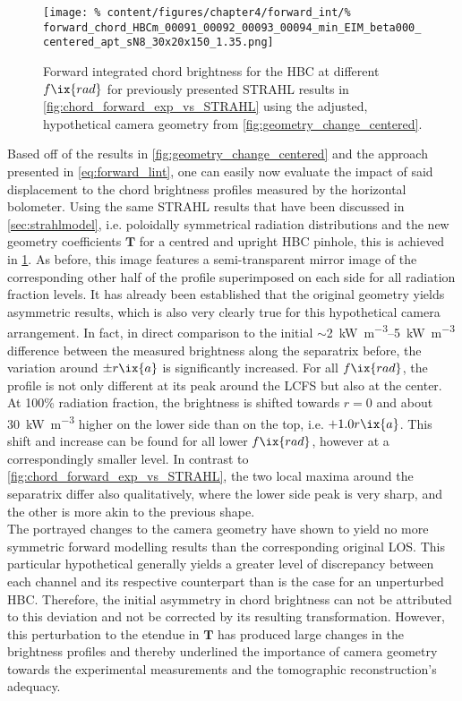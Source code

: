 %
            \begin{figure}[t]%
                \centering%
                \texttt{[image: \%
                    content/figures/chapter4/forward\_int/\%
                    forward\_chord\_HBCm\_00091\_00092\_00093\_00094\_min\_EIM\_beta000\_centered\_apt\_sN8\_30x20x150\_1.35.png]}%
                \caption{Forward integrated chord brightness for the HBC at different $f\ix{rad}$ for previously presented STRAHL results in \cref{fig:chord_forward_exp_vs_STRAHL} using the adjusted, hypothetical camera geometry from \cref{fig:geometry_change_centered}.}\label{fig:forward_intSTRAHL_centered}%
            \end{figure}%
%
            Based off of the results in \cref{fig:geometry_change_centered} and the approach presented in \cref{eq:forward_lint}, one can easily now evaluate the impact of said displacement to the chord brightness profiles measured by the horizontal bolometer. Using the same STRAHL results that have been discussed in \cref{sec:strahlmodel}, i.e. poloidally symmetrical radiation distributions and the new geometry coefficients $\mathbf{T}$ for a centred and upright HBC pinhole, this is achieved in \cref{fig:forward_intSTRAHL_centered}. As before, this image features a semi-transparent mirror image of the corresponding other half of the profile superimposed on each side for all radiation fraction levels. It has already been established that the original geometry yields asymmetric results, which is also very clearly true for this hypothetical camera arrangement. In fact, in direct comparison to the initial $\sim$\SIrange{2}{5}{\kilo\watt\per\cubic\meter} difference between the measured brightness along the separatrix before, the variation around $\pm r\ix{a}$ is significantly increased. For all $f\ix{rad}$, the profile is not only different at its peak around the LCFS but also at the center. At 100\% radiation fraction, the brightness is shifted towards $r=0$ and about \SI{30}{\kilo\watt\per\cubic\meter} higher on the lower side than on the top, i.e. $+1.0r\ix{a}$. This shift and increase can be found for all lower $f\ix{rad}$, however at a correspondingly smaller level. In contrast to \cref{fig:chord_forward_exp_vs_STRAHL}, the two local maxima around the separatrix differ also qualitatively, where the lower side peak is very sharp, and the other is more akin to the previous shape.\\%
            The portrayed changes to the camera geometry have shown to yield no more symmetric forward modelling results than the corresponding original LOS. This particular hypothetical generally yields a greater level of discrepancy between each channel and its respective counterpart than is the case for an unperturbed HBC. Therefore, the initial asymmetry in chord brightness can not be attributed to this deviation and not be corrected by its resulting transformation. However, this perturbation to the etendue in $\mathbf{T}$ has produced large changes in the brightness profiles and thereby underlined the importance of camera geometry towards the experimental measurements and the tomographic reconstruction's adequacy.%
%
